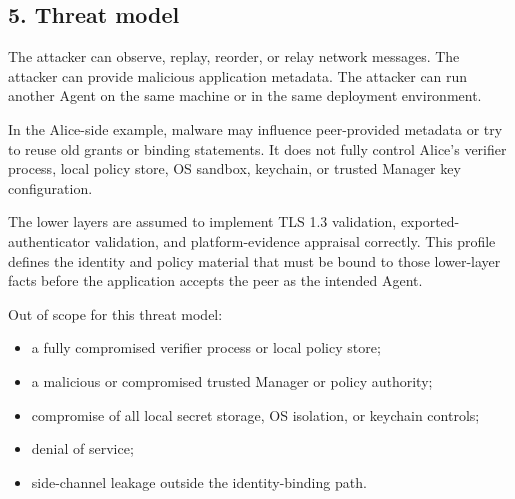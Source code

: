 \documentclass[
]{article}
\providecommand{\tightlist}{%
  \setlength{\itemsep}{0pt}\setlength{\parskip}{0pt}}
\begin{document}
\subsection{5. Threat model}\label{threat-model}

The attacker can observe, replay, reorder, or relay network messages.
The attacker can provide malicious application metadata. The attacker
can run another Agent on the same machine or in the same deployment
environment.

In the Alice-side example, malware may influence peer-provided metadata
or try to reuse old grants or binding statements. It does not fully
control Alice's verifier process, local policy store, OS sandbox,
keychain, or trusted Manager key configuration.

The lower layers are assumed to implement TLS 1.3 validation,
exported-authenticator validation, and platform-evidence appraisal
correctly. This profile defines the identity and policy material that
must be bound to those lower-layer facts before the application accepts
the peer as the intended Agent.

Out of scope for this threat model:

\begin{itemize}
\tightlist
\item
  a fully compromised verifier process or local policy store;
\item
  a malicious or compromised trusted Manager or policy authority;
\item
  compromise of all local secret storage, OS isolation, or keychain
  controls;
\item
  denial of service;
\item
  side-channel leakage outside the identity-binding path.
\end{itemize}
\end{document}

